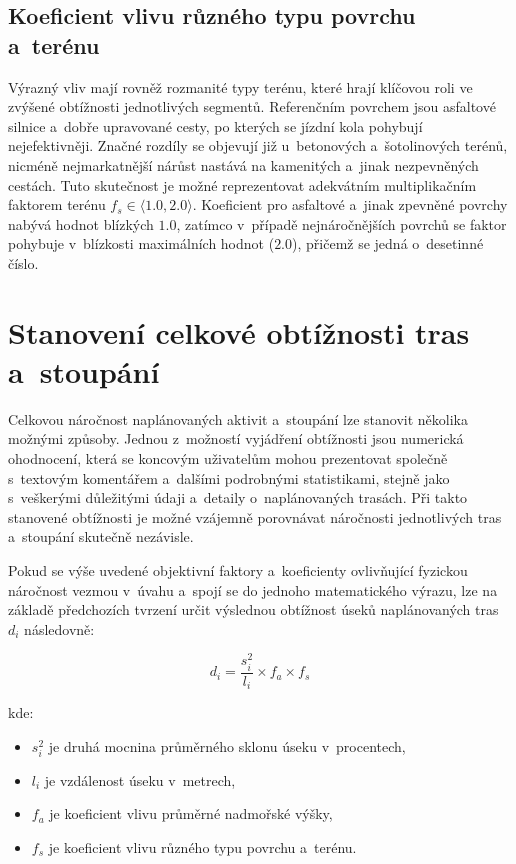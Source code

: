 \subsection{Koeficient vlivu různého typu povrchu a~terénu}
\label{effect-coefficients-for-different-types-of-surfaces-and-terrains}

Výrazný vliv mají rovněž rozmanité typy terénu, které hrají klíčovou roli ve zvýšené obtížnosti jednotlivých segmentů.
Referenčním povrchem jsou asfaltové silnice a~dobře upravované cesty, po kterých se jízdní kola pohybují nejefektivněji.
Značné rozdíly se objevují již u~betonových a~šotolinových terénů, nicméně nejmarkatnější nárůst nastává na kamenitých a~jinak nezpevněných cestách.
Tuto skutečnost je možné reprezentovat adekvátním multiplikačním faktorem terénu $f_s \in \langle 1.0, 2.0 \rangle$.
Koeficient pro asfaltové a~jinak zpevněné povrchy nabývá hodnot blízkých $1.0$, zatímco v~případě nejnáročnějších povrchů se faktor pohybuje v~blízkosti maximálních hodnot ($2.0$), přičemž se jedná o~desetinné číslo.

\section{Stanovení celkové obtížnosti tras a~stoupání}
\label{determination-of-the-overall-difficulty-of-routes-and-climbs}

Celkovou náročnost naplánovaných aktivit a~stoupání lze stanovit několika možnými způsoby.
Jednou z~možností vyjádření obtížnosti jsou numerická ohodnocení, která se koncovým uživatelům mohou prezentovat společně s~textovým komentářem a~dalšími podrobnými statistikami, stejně jako s~veškerými důležitými údaji a~detaily o~naplánovaných trasách.
Při takto stanovené obtížnosti je možné vzájemně porovnávat náročnosti jednotlivých tras a~stoupání skutečně nezávisle.

Pokud se výše uvedené objektivní faktory a~koeficienty ovlivňující fyzickou náročnost vezmou v~úvahu a~spojí se do jednoho matematického výrazu, lze na základě předchozích tvrzení určit výslednou obtížnost úseků naplánovaných tras $d_i$ následovně:

\[
    d_i = \frac{s_i^2}{l_i} \times f_a \times f_s
\]

kde:
\begin{itemize}
    \item $s_i^2$ je druhá mocnina průměrného sklonu úseku v~procentech,
    \item $l_i$ je vzdálenost úseku v~metrech,
    \item $f_a$ je koeficient vlivu průměrné nadmořské výšky,
    \item $f_s$ je koeficient vlivu různého typu povrchu a~terénu.
\end{itemize}

